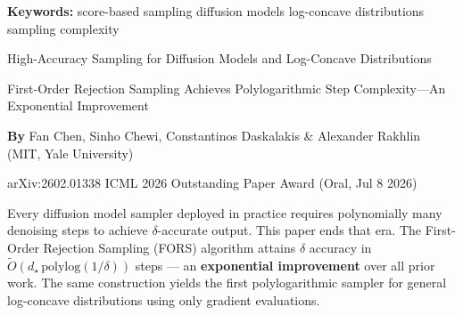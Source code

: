 \documentclass[10pt,twocolumn]{article}
\begin{document}
\setlength{\parindent}{0pt}
\setlength{\parskip}{4pt}

{\small\color{keywordgray}\textbf{Keywords:}
  score-based sampling \textbullet{}
  diffusion models \textbullet{}
  log-concave distributions \textbullet{}
  sampling complexity}\par\vspace{4pt}

{\LARGE\bfseries\raggedright
  High-Accuracy Sampling for Diffusion Models
  and Log-Concave Distributions}\par\vspace{4pt}

{\large\itshape\raggedright
  First-Order Rejection Sampling Achieves
  Polylogarithmic Step Complexity---An Exponential Improvement}\par\vspace{6pt}

{\small\textbf{By} Fan Chen, Sinho Chewi, Constantinos Daskalakis \&
  Alexander Rakhlin (MIT, Yale University)}\par\vspace{2pt}

{\small\color{keywordgray}arXiv:2602.01338 \textbullet{}
  ICML 2026 Outstanding Paper Award (Oral, Jul 8 2026)}
\par\vspace{2pt}\noindent{\color{rulered}\rule{\columnwidth}{0.6pt}}\vspace{6pt}

Every diffusion model sampler deployed in practice requires polynomially many
denoising steps to achieve $\delta$-accurate output. This paper ends that
era. The First-Order Rejection Sampling (FORS) algorithm attains $\delta$
accuracy in $\widetilde{O}(d_\star\,\mathrm{polylog}(1/\delta))$ steps ---
an \textbf{exponential improvement} over all prior work. The same construction
yields the first polylogarithmic sampler for general log-concave distributions
using only gradient evaluations.
\end{document}
